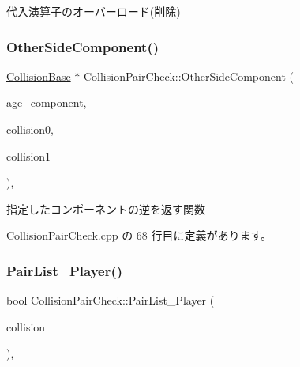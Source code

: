 代入演算子のオーバーロード(削除) 

\mbox{\label{class_collision_pair_check_a97c459f98bce9f88d9f506423395c40c}} 
\subsubsection{\texorpdfstring{Other\+Side\+Component()}{OtherSideComponent()}}
{\footnotesize\ttfamily \mbox{\hyperlink{class_collision_base}{Collision\+Base}} $\ast$ Collision\+Pair\+Check\+::\+Other\+Side\+Component (\begin{DoxyParamCaption}\item[{\mbox{\hyperlink{class_collision_base}{Collision\+Base}} $\ast$}]{age\+\_\+component,  }\item[{\mbox{\hyperlink{class_collision_base}{Collision\+Base}} $\ast$}]{collision0,  }\item[{\mbox{\hyperlink{class_collision_base}{Collision\+Base}} $\ast$}]{collision1 }\end{DoxyParamCaption})\hspace{0.3cm}{\ttfamily [static]}, {\ttfamily [private]}}



指定したコンポーネントの逆を返す関数 



 Collision\+Pair\+Check.\+cpp の 68 行目に定義があります。

\mbox{\label{class_collision_pair_check_a9f1819e873a51fcf50a7dbbf5f9d8690}} 
\subsubsection{\texorpdfstring{Pair\+List\+\_\+\+Player()}{PairList\_Player()}}
{\footnotesize\ttfamily bool Collision\+Pair\+Check\+::\+Pair\+List\+\_\+\+Player (\begin{DoxyParamCaption}\item[{\mbox{\hyperlink{class_collision_base}{Collision\+Base}} $\ast$}]{collision }\end{DoxyParamCaption})\hspace{0.3cm}{\ttfamily [static]}, {\ttfamily [private]}}



